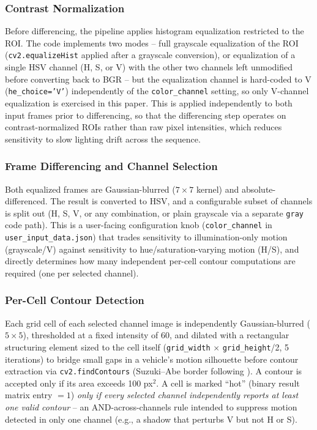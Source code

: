 \documentclass[conference]{IEEEtran}
\newcommand{\code}[1]{\texttt{#1}}
\begin{document}
\subsubsection{Contrast Normalization}
Before differencing, the pipeline applies histogram equalization
restricted to the ROI. The code implements two modes -- full grayscale
equalization of the ROI (\code{cv2.equalizeHist} applied after a
grayscale conversion), or equalization of a single HSV channel (H, S,
or V) with the other two channels left unmodified before converting
back to BGR -- but the equalization channel is hard-coded to V
(\code{he\_choice='V'}) independently of the \code{color\_channel}
setting, so only V-channel equalization is exercised in this paper. This
is applied independently to both input frames prior
to differencing, so that the differencing step operates on
contrast-normalized ROIs rather than raw pixel intensities, which
reduces sensitivity to slow lighting drift across the sequence.

\subsubsection{Frame Differencing and Channel Selection}
Both equalized frames are Gaussian-blurred ($7\times7$ kernel) and
absolute-differenced. The result is converted to HSV, and a
configurable subset of channels is split out (H, S, V, or any
combination, or plain grayscale via a separate \code{gray} code path).
This is a user-facing configuration knob (\code{color\_channel} in
\code{user\_input\_data.json}) that trades sensitivity to
illumination-only motion (grayscale/V) against sensitivity to
hue/saturation-varying motion (H/S), and directly determines how many
independent per-cell contour computations are required (one per
selected channel).

\subsubsection{Per-Cell Contour Detection}
\label{sec:cellcontour}
Each grid cell of each selected channel image is independently
Gaussian-blurred ($5\times5$), thresholded at a fixed intensity of 60,
and dilated with a rectangular structuring element sized to the cell
itself (\code{grid\_width} $\times$ \code{grid\_height}/2, 5 iterations)
to bridge small gaps in a vehicle's motion silhouette before contour
extraction via \code{cv2.findContours} (Suzuki--Abe border following
\cite{suzuki1985}). A contour is accepted only if its area exceeds 100
px$^2$. A cell is marked ``hot'' (binary result matrix entry $=1$)
\emph{only if every selected channel independently reports at least one
valid contour} -- an AND-across-channels rule intended to suppress
motion detected in only one channel (e.g., a shadow that perturbs V but
not H or S).
\end{document}
